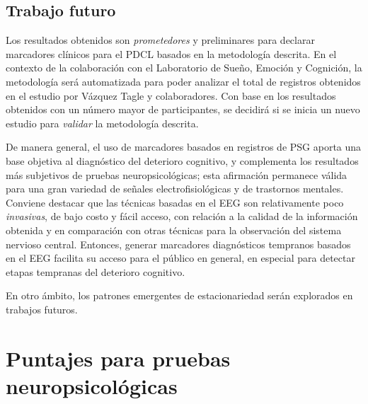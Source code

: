 \documentclass[12pt,letterpaper]{book}
\begin{document}
\section{Trabajo futuro}

Los resultados obtenidos son \textit{prometedores} y preliminares para declarar marcadores clínicos para el PDCL basados en la metodología descrita.
%
En el contexto de la colaboración con el Laboratorio de Sueño, Emoción y Cognición, la metodología será automatizada para poder analizar el total de registros obtenidos en el estudio por Vázquez Tagle y colaboradores.
%
Con base en los resultados obtenidos con un número mayor de participantes, se decidirá si se inicia un nuevo estudio para \textit{validar} la metodología descrita.

De manera general, el uso de marcadores basados en registros de PSG aporta una base objetiva al diagnóstico del deterioro cognitivo, y complementa los resultados más subjetivos de pruebas neuropsicológicas; esta afirmación permanece válida para una gran variedad de señales electrofisiológicas y de trastornos mentales.
%
Conviene destacar que las técnicas basadas en el EEG son relativamente poco \textit{invasivas}, de bajo costo y fácil acceso, con relación a la calidad de la información obtenida y en comparación con otras técnicas para la observación del sistema nervioso central.
%
Entonces, generar marcadores diagnósticos tempranos basados en el EEG facilita su acceso para el público en general, en especial para detectar etapas tempranas del deterioro cognitivo.

En otro ámbito, los patrones emergentes de estacionariedad serán explorados en trabajos futuros.


\appendix

\chapter{Puntajes para pruebas neuropsicológicas}
\label{apendice_pruebas}
\end{document}
